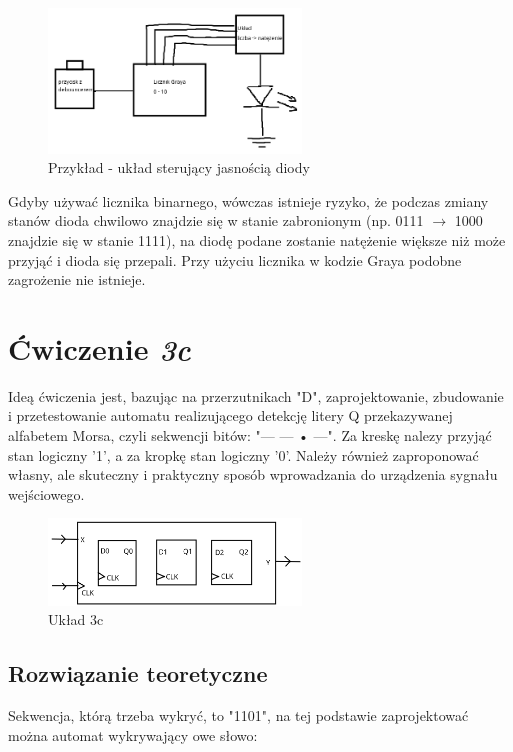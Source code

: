 \documentclass{article}
\begin{document}
\begin{itemize}
    \begin{figure}[H]
        \centering
        \includegraphics[width=0.6\textwidth]{3b_przyklad.jpg}
        \caption{Przykład - układ sterujący jasnością diody}
    \end{figure}

    Gdyby używać licznika binarnego, wówczas istnieje ryzyko, że podczas zmiany stanów dioda chwilowo znajdzie się w stanie zabronionym
    (np. 0111 $\rightarrow$ 1000 znajdzie się w stanie 1111), na diodę podane zostanie natężenie większe niż może przyjąć i dioda się przepali.
    Przy użyciu licznika w kodzie Graya podobne zagrożenie nie istnieje.

\end{itemize}

\pagebreak
\section{Ćwiczenie \textit{3c}}
Ideą ćwiczenia jest, bazując na przerzutnikach "D", zaprojektowanie, zbudowanie i przetestowanie automatu realizującego detekcję litery Q
przekazywanej alfabetem Morsa, czyli sekwencji bitów: "— — • —". Za kreskę nalezy przyjąć stan logiczny '1', a za kropkę stan logiczny
'0'. Należy również zaproponować własny, ale skuteczny i praktyczny sposób wprowadzania do urządzenia sygnału wejściowego.

\begin{figure}[H]
    \centering
    \includegraphics[width=0.6\textwidth]{3c_idea.jpg}
    \caption{Układ 3c}
\end{figure}

\subsection{Rozwiązanie teoretyczne}
Sekwencja, którą trzeba wykryć, to "1101", na tej podstawie zaprojektować można automat wykrywający owe słowo:
\end{document}

